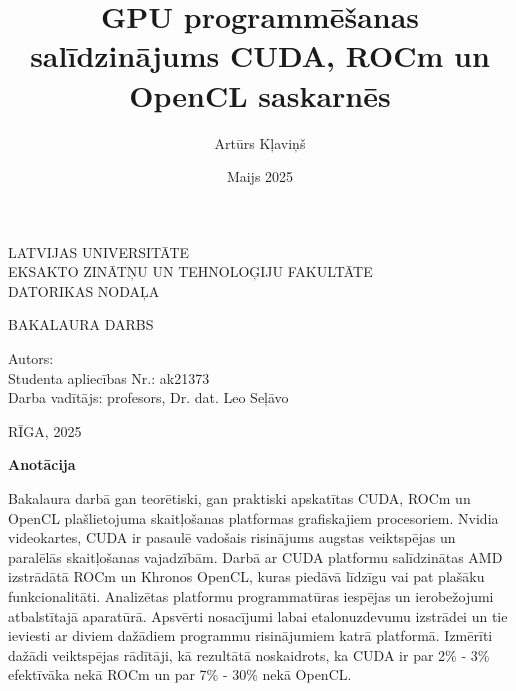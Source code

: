 \documentclass[12pt]{report}%
\author{Artūrs Kļaviņš}
\title{GPU programmēšanas salīdzinājums CUDA, ROCm un OpenCL saskarnēs}
\date{Maijs 2025}
\theoremstyle{definition}
\def\degree{Bakalaura darbs}
\def\faculty{Eksakto zinātņu un tehnoloģiju fakultāte}
\def\department{Datorikas nodaļa}
\def\vietlaiks{Rīga, 2025}
\def\supervisor{Darba vadītājs: profesors, Dr. dat. Leo Seļāvo}
\def\studaplieciba{ak21373}
\begin{document}
\thispagestyle{empty}
\makeatletter
   \begin{center}
       \vspace*{1cm}
        
    \vspace{10mm}
    {\Large LATVIJAS UNIVERSITĀTE\\
    \MakeUppercase{\faculty}\\
    \vspace{2mm}
    \MakeUppercase{\department}
    }
    \vspace*{10mm}
    
    
    
    \vspace{5mm}
    {\Large \MakeUppercase{\textbf{\@title}}}
    \vspace{5mm}
    

       \vspace{1cm}
    \Large
    \MakeUppercase{\degree}
    \end{center}
    \vspace{3cm}
    \begin{flushleft}
    \large
       Autors: \textbf{\large \@author}\\
       Studenta apliecības Nr.: \studaplieciba \\
       \supervisor
    \end{flushleft}

       \vfill
     
    \begin{center}
    \Large      
    \MakeUppercase{\vietlaiks}
   \end{center}
\makeatother

\newpage




\thispagestyle{empty}
\noindent \textbf{Anotācija}

\noindent Bakalaura darbā gan teorētiski, gan praktiski apskatītas CUDA, ROCm
un OpenCL  plašlietojuma skaitļošanas platformas grafiskajiem procesoriem.
Nvidia videokartes, CUDA ir pasaulē vadošais risinājums augstas veiktspējas un
paralēlās skaitļošanas vajadzībām. Darbā ar CUDA platformu salīdzinātas AMD
izstrādātā ROCm un Khronos OpenCL, kuras piedāvā līdzīgu vai pat plašāku
funkcionalitāti. Analizētas platformu programmatūras iespējas un ierobežojumi
atbalstītajā aparatūrā. Apsvērti nosacījumi labai etalonuzdevumu izstrādei un
tie ieviesti ar diviem dažādiem programmu risinājumiem katrā platformā.
Izmērīti dažādi veiktspējas rādītāji, kā rezultātā noskaidrots, ka CUDA ir par
2\% - 3\% efektīvāka nekā ROCm un par 7\% - 30\% nekā OpenCL.
\end{document}
